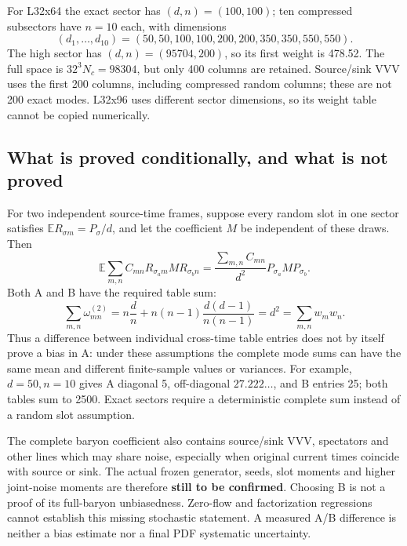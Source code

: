 \documentclass[11pt]{article}
\numberwithin{equation}{section}
\begin{document}
For L32x64 the exact sector has \((d,n)=(100,100)\); ten compressed
subsectors have \(n=10\) each, with dimensions
\begin{equation}
 (d_1,\ldots,d_{10})=(50,50,100,100,200,200,350,350,550,550).
\end{equation}
The high sector has \((d,n)=(95704,200)\), so its first weight is
478.52. The full space is \(32^3N_c=98304\), but only 400 columns are
retained. Source/sink VVV uses the first 200 columns, including compressed
random columns; these are not 200 exact modes. L32x96 uses different sector
dimensions, so its weight table cannot be copied numerically.

\subsection{What is proved conditionally, and what is not proved}

For two independent source-time frames, suppose every random slot in one
sector satisfies \(\mathbb E R_{\sigma m}=P_\sigma/d\), and let the
coefficient \(M\) be independent of these draws. Then
\begin{equation}
 \mathbb E\sum_{m,n}C_{mn}R_{\sigma_a m}M R_{\sigma_b n}
 =\frac{\sum_{m,n}C_{mn}}{d^2}P_{\sigma_a}MP_{\sigma_b}.
\end{equation}
Both A and B have the required table sum:
\begin{equation}
 \sum_{m,n}\omega^{(2)}_{mn}
 =n\frac dn+n(n-1)\frac{d(d-1)}{n(n-1)}=d^2
 =\sum_{m,n}w_mw_n.
\end{equation}
Thus a difference between individual cross-time table entries does not by
itself prove a bias in A: under these assumptions the complete mode sums
can have the same mean and different finite-sample values or variances.
For example, \(d=50,n=10\) gives A diagonal 5, off-diagonal
\(27.222\ldots\), and B entries 25; both tables sum to 2500.
Exact sectors require a deterministic complete sum instead of a random
slot assumption.

The complete baryon coefficient also contains source/sink VVV, spectators
and other lines which may share noise, especially when original current
times coincide with source or sink. The actual frozen generator, seeds,
slot moments and higher joint-noise moments are therefore \textbf{still
to be confirmed}. Choosing B is not a proof of its full-baryon
unbiasedness. Zero-flow and factorization regressions cannot establish
this missing stochastic statement. A measured A/B difference is neither
a bias estimate nor a final PDF systematic uncertainty.
\end{document}
